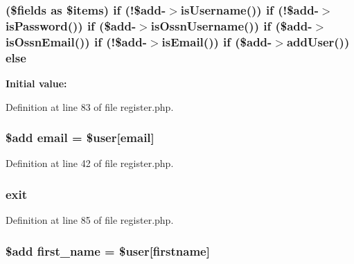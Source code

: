 \subsubsection[{\texorpdfstring{else}{else}}]{ (\$fields as \$items) {\bf if} (!\${\bf add}-\/$>$is\+Username()) {\bf if} (!\${\bf add}-\/$>$is\+Password()) {\bf if} (\${\bf add}-\/$>$is\+Ossn\+Username()) {\bf if} (\${\bf add}-\/$>$is\+Ossn\+Email()) {\bf if} (!\${\bf add}-\/$>$is\+Email()) {\bf if} (\${\bf add}-\/$>$add\+User()) else}\hypertarget{register_8php_a5df0ed50681564b6d88356ea22856eac}{}\label{register_8php_a5df0ed50681564b6d88356ea22856eac}
{\bfseries Initial value\+:}


Definition at line 83 of file register.\+php.

\subsubsection[{\texorpdfstring{email}{email}}]{\setlength{\rightskip}{0pt plus 5cm}\${\bf add} email = \${\bf user}\mbox{[}\textquotesingle{}email\textquotesingle{}\mbox{]}}\hypertarget{register_8php_a011c66ae212438e0d7de7c0e40451bb3}{}\label{register_8php_a011c66ae212438e0d7de7c0e40451bb3}


Definition at line 42 of file register.\+php.

\subsubsection[{\texorpdfstring{exit}{exit}}]{\setlength{\rightskip}{0pt plus 5cm}exit}\hypertarget{register_8php_a6733eb5f605d09eaede9845835d71c4e}{}\label{register_8php_a6733eb5f605d09eaede9845835d71c4e}


Definition at line 85 of file register.\+php.

\subsubsection[{\texorpdfstring{first\+\_\+name}{first_name}}]{\setlength{\rightskip}{0pt plus 5cm}\${\bf add} first\+\_\+name = \${\bf user}\mbox{[}\textquotesingle{}firstname\textquotesingle{}\mbox{]}}\hypertarget{register_8php_a9a79298edb546fb2a33bc6d266131c04}{}\label{register_8php_a9a79298edb546fb2a33bc6d266131c04}


